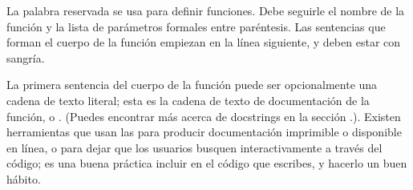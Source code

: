 \documentclass[a4,10pt,spanish]{sphinxmanual}
\begin{document}
\begin{sphinxVerbatim}[commandchars=\\\{\}]
     
    
        
       
         
            
    
\end{sphinxVerbatim}

\ignorespaces 
\sphinxAtStartPar
La palabra reservada  se usa para definir funciones. Debe seguirle el nombre de la función y la lista de parámetros formales entre paréntesis. Las sentencias que forman el cuerpo de la función empiezan en la línea siguiente, y deben estar con sangría.

\sphinxAtStartPar
La primera sentencia del cuerpo de la función puede ser opcionalmente una cadena de texto literal; esta es la cadena de texto de documentación de la función, o . (Puedes encontrar más acerca de docstrings en la sección {\hyperref[\detokenize{tutorial/controlflow:tut-docstrings}]{}}.). Existen herramientas que usan las  para producir documentación imprimible o disponible en línea, o para dejar que los usuarios busquen interactivamente a través del código; es una buena práctica incluir  en el código que escribes, y hacerlo un buen hábito.
\end{document}

